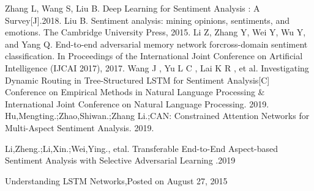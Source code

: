\documentclass[twocolumn]{ctexart}
\begin{document}
\begin{thebibliography}{99}  
 Zhang L, Wang S, Liu B. Deep Learning for Sentiment Analysis : A Survey[J].2018.
 Liu  B.  Sentiment  analysis:  mining  opinions,  sentiments,  and  emotions.  The  Cambridge  University  Press, 2015.
Li  Z,  Zhang Y,  Wei  Y,  Wu  Y, and Yang  Q.  End-to-end  adversarial  memory  network  forcross-domain sentiment  classification.  In Proceedings  of  the  International  Joint  Conference  on  Artificial  Intelligence  (IJCAI 2017), 2017.  
Wang J , Yu L C , Lai K R , et al. Investigating Dynamic Routing in Tree-Structured LSTM for Sentiment Analysis[C] Conference on Empirical Methods in Natural Language Processing & International Joint Conference on Natural Language Processing. 2019.
 Hu,Mengting.;Zhao,Shiwan.;Zhang Li.;CAN: Constrained Attention Networks for Multi-Aspect Sentiment Analysis. 2019.

 Li,Zheng.;Li,Xin.;Wei,Ying., etal. Transferable End-to-End Aspect-based Sentiment Analysis with Selective Adversarial Learning .2019

Understanding LSTM Networks,Posted on August 27, 2015
\end{thebibliography}
\end{document}
